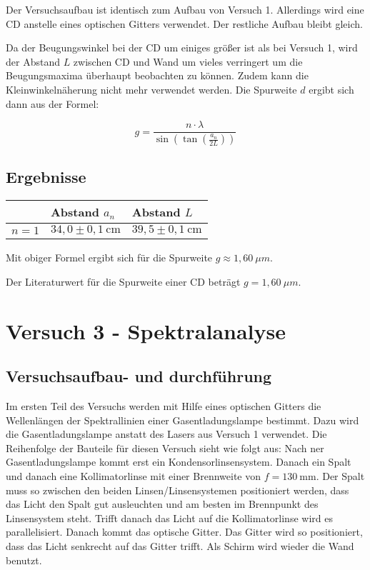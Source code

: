         Der Versuchsaufbau ist identisch zum Aufbau von Versuch 1. Allerdings wird eine CD anstelle eines optischen Gitters verwendet. Der restliche Aufbau bleibt gleich.

        Da der Beugungswinkel bei der CD um einiges größer ist als bei Versuch 1, wird der Abstand $L$ zwischen CD und Wand um vieles verringert um die Beugungsmaxima überhaupt beobachten zu können. Zudem kann die Kleinwinkelnäherung nicht mehr verwendet werden. Die Spurweite $d$ ergibt sich dann aus der Formel:

        $$g = \frac{n \cdot \lambda}{\sin(\tan(\frac{a_{n}}{2 L}))}$$

    \subsection{Ergebnisse}
        
        \begin{table}[H]
            \centering
            \begin{tabular}{|l|l|l|}
                \hline
                & Abstand $a_{n}$ & Abstand $L$\\
                \hline
                $n = 1$ & $34,0 \pm 0,1\ \mathrm{cm}$ & $39,5 \pm 0,1\ \mathrm{cm}$\\
                \hline
            \end{tabular}
        \end{table}

        Mit obiger Formel ergibt sich für die Spurweite $g \approx 1,60\ \mu m$.

        Der Literaturwert für die Spurweite einer CD beträgt $g = 1,60\ \mu m$.

\section{Versuch 3 - Spektralanalyse}
    
    \subsection{Versuchsaufbau- und durchführung}
        
        Im ersten Teil des Versuchs werden mit Hilfe eines optischen Gitters die Wellenlängen der Spektrallinien einer Gasentladungslampe bestimmt. Dazu wird die Gasentladungslampe anstatt des Lasers aus Versuch 1 verwendet. Die Reihenfolge der Bauteile für diesen Versuch sieht wie folgt aus:
        Nach ner Gasentladungslampe kommt erst ein Kondensorlinsensystem. Danach ein Spalt und danach eine Kollimatorlinse mit einer Brennweite von $f = 130\ \mathrm{mm}$. Der Spalt muss so zwischen den beiden Linsen/Linsensystemen positioniert werden, dass das Licht den Spalt gut ausleuchten und am besten im Brennpunkt des Linsensystem steht. Trifft danach das Licht auf die Kollimatorlinse wird es parallelisiert. Danach kommt das optische Gitter. Das Gitter wird so positioniert, dass das Licht senkrecht auf das Gitter trifft. Als Schirm wird wieder die Wand benutzt.

